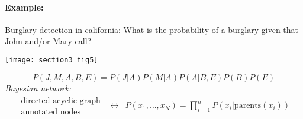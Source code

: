 \paragraph{Example:} Burglary detection in california: What is the probability of a burglary given that John and/or Mary call? 
\begin{center} \texttt{[image: section3\_fig5]} \end{center}
\begin{equation}
	P(J,M,A,B,E) = P(J|A)P(M|A)P(A|B,E)P(B)P(E)
\end{equation}
\emph{Bayesian network:}
\[ \begin{array}{lcl}
	\substack{\text{directed acyclic graph} \\ \text{annotated nodes}}
	& \longleftrightarrow &
	P(x_1, \ldots, x_N) = \prod\limits_{i=1}^n P(x_i|\mathrm{parents}(x_i))
\end{array} \]

